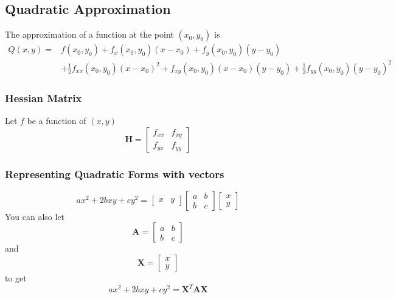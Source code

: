 \documentclass[12pt]{article}
\theoremstyle{break}
\numberwithin{theorem}{subsection}
\numberwithin{lemma}{subsection}
\numberwithin{corollary}{subsection}
\numberwithin{equation}{subsection}
\newcommand{\vect}[1]{\boldsymbol{#1}}
\begin{document}
\subsection{Quadratic Approximation}
The approximation of a function at the point $(x_0, y_0)$ is 
\begin{align*}
	Q(x,y) = &f(x_0, y_0) + f_x(x_0, y_0)(x-x_0) + f_y(x_0, y_0)(y-y_0) \\
	& + \frac12 f_{xx}(x_0, y_0)(x-x_0)^2 + f_{xy}(x_0, y_0)(x-x_0)(y-y_0) + \frac12 f_{yy}(x_0, y_0)(y-y_0)^2
\end{align*}

\subsubsection{Hessian Matrix}
Let $f$ be a function of $(x,y)$
\begin{equation*}
	\vect{H} = 
	\begin{bmatrix}
		f_{xx} & f_{xy} \\
		f_{yx} & f_{yy} 
	\end{bmatrix}
\end{equation*}

\subsubsection{Representing Quadratic Forms with vectors}
\begin{equation*}
ax^2 + 2bxy + cy^2 = 
\begin{bmatrix}
x & y
\end{bmatrix}
\begin{bmatrix}
a & b \\
b & c
\end{bmatrix}
\begin{bmatrix}
x \\
y
\end{bmatrix}
\end{equation*}
You can also let 
\begin{equation*}
\vect{A} = 
\begin{bmatrix}
a & b \\
b & c
\end{bmatrix}
\end{equation*}
and 
\begin{equation*}
\vect{X} = 
\begin{bmatrix}
x \\
y
\end{bmatrix}
\end{equation*}
to get 
\begin{equation*}
ax^2 + 2bxy + cy^2 = \vect{X}^T \vect{A} \vect{X}
\end{equation*}
\end{document}
